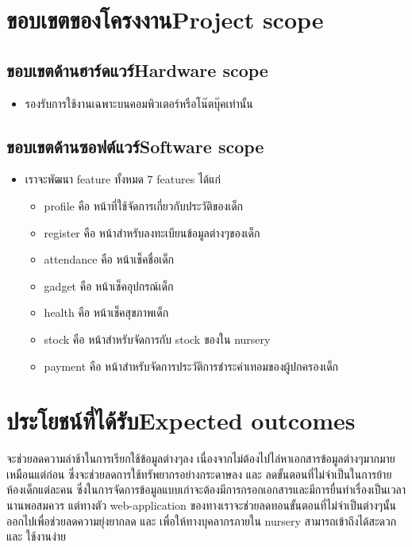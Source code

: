 \section{\ifcpe ขอบเขตของโครงงาน\else Project scope\fi}

\subsection{\ifcpe ขอบเขตด้านฮาร์ดแวร์\else Hardware scope\fi}
\begin{itemize}
    \item รองรับการใช้งานเฉพาะบนคอมพิวเตอร์หรือโน๊ตบุ๊คเท่านั้น

\end{itemize}

\subsection{\ifcpe ขอบเขตด้านซอฟต์แวร์\else Software scope\fi}
\begin{itemize}
    \item เราจะพัฒนา feature ทั้งหมด 7 features ได้แก่
    \begin{itemize}
        \item profile คือ หน้าที่ใช้จัดการเกี่ยวกับประวัติของเด็ก
        \item  register คือ หน้าสำหรับลงทะเบียนข้อมูลต่างๆของเด็ก
        \item attendance คือ หน้าเช็คชื่อเด็ก
        \item gadget คือ หน้าเช็คอุปกรณ์เด็ก
        \item health คือ หน้าเช็คสุขภาพเด็ก
        \item stock คือ หน้าสำหรับจัดการกับ stock ของใน nursery
        \item payment คือ หน้าสำหรับจัดการประวัติการชำระค่าเทอมของผู้ปกครองเด็ก
    \end{itemize}
\end{itemize}

\section{\ifcpe ประโยชน์ที่ได้รับ\else Expected outcomes\fi}
จะช่วยลดความล่าช้าในการเรียกใช้ข้อมูลต่างๆลง เนื่องจากไม่ต้องไปไล่หาเอกสารข้อมูลต่างๆมากมายเหมือนแต่ก่อน ซึ่งจะช่วยลดการใช้ทรัพยากรอย่างกระดาษลง และ 
ลดขั้นตอนที่ไม่จำเป็นในการย้ายห้องเด็กแต่ละคน ซึ่งในการจัดการข้อมูลแบบเก่าจะต้องมีการกรอกเอกสารและมีการยื่นทำเรื่องเป็นเวลานานพอสมควร แต่ทางตัว web-application ของทางเราจะช่วยลดทอนขั้นตอนที่ไม่จำเป็นต่างๆนั้นออกไปเพื่อช่วยลดความยุ่งยากลด และ เพื่อให้ทางบุคลากรภายใน nursery สามารถเข้าถึงได้สะดวก และ ใช้งานง่าย

